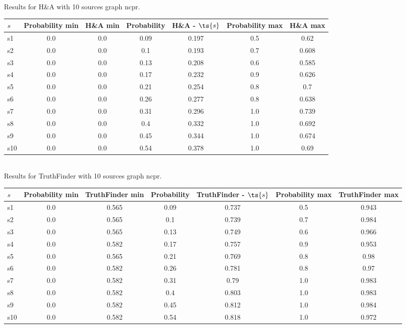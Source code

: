 \documentclass{article}
\begin{document}
\noindent Results for H\&A with 10 sources graph ncpr.

\noindent\begin{tabular}{|l|c|c|c|c|c|c|}
\hline
$s$& Probability min & H\&A min & Probability & H\&A - $\ts{s}$ & Probability max & H\&A max\\
\hline
s1 &0.0 & 0.0 & 0.09 & 0.197 & 0.5 & 0.62\\
\hline
s2 &0.0 & 0.0 & 0.1 & 0.193 & 0.7 & 0.608\\
\hline
s3 &0.0 & 0.0 & 0.13 & 0.208 & 0.6 & 0.585\\
\hline
s4 &0.0 & 0.0 & 0.17 & 0.232 & 0.9 & 0.626\\
\hline
s5 &0.0 & 0.0 & 0.21 & 0.254 & 0.8 & 0.7\\
\hline
s6 &0.0 & 0.0 & 0.26 & 0.277 & 0.8 & 0.638\\
\hline
s7 &0.0 & 0.0 & 0.31 & 0.296 & 1.0 & 0.739\\
\hline
s8 &0.0 & 0.0 & 0.4 & 0.332 & 1.0 & 0.692\\
\hline
s9 &0.0 & 0.0 & 0.45 & 0.344 & 1.0 & 0.674\\
\hline
s10 &0.0 & 0.0 & 0.54 & 0.378 & 1.0 & 0.69\\
\hline
\end{tabular}\\

\noindent Results for TruthFinder with 10 sources graph ncpr.

\noindent\begin{tabular}{|l|c|c|c|c|c|c|}
\hline
$s$& Probability min & TruthFinder min & Probability & TruthFinder - $\ts{s}$ & Probability max & TruthFinder max\\
\hline
s1 &0.0 & 0.565 & 0.09 & 0.737 & 0.5 & 0.943\\
\hline
s2 &0.0 & 0.565 & 0.1 & 0.739 & 0.7 & 0.984\\
\hline
s3 &0.0 & 0.565 & 0.13 & 0.749 & 0.6 & 0.966\\
\hline
s4 &0.0 & 0.582 & 0.17 & 0.757 & 0.9 & 0.953\\
\hline
s5 &0.0 & 0.565 & 0.21 & 0.769 & 0.8 & 0.98\\
\hline
s6 &0.0 & 0.582 & 0.26 & 0.781 & 0.8 & 0.97\\
\hline
s7 &0.0 & 0.582 & 0.31 & 0.79 & 1.0 & 0.983\\
\hline
s8 &0.0 & 0.582 & 0.4 & 0.803 & 1.0 & 0.983\\
\hline
s9 &0.0 & 0.582 & 0.45 & 0.812 & 1.0 & 0.984\\
\hline
s10 &0.0 & 0.582 & 0.54 & 0.818 & 1.0 & 0.972\\
\hline
\end{tabular}\\
\end{document}
